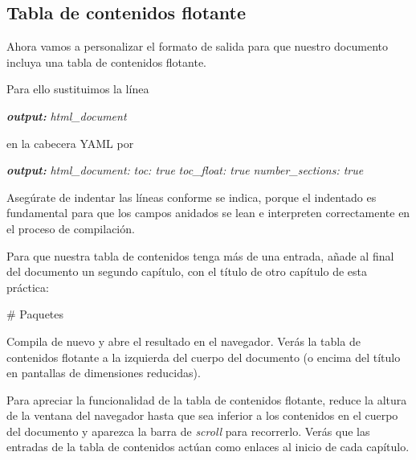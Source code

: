 \documentclass[
  degree=mecinf,
  title=normal,
  toc=normal,
  bib=normal]{mnye}
\newenvironment{Shaded}{\begin{snugshade}}{\end{snugshade}}
\newcommand{\AnnotationTok}[1]{\textcolor[rgb]{0.56,0.35,0.01}{\textbf{\textit{#1}}}}
\newcommand{\CommentTok}[1]{\textcolor[rgb]{0.56,0.35,0.01}{\textit{#1}}}
\newcommand{\FunctionTok}[1]{\textcolor[rgb]{0.00,0.00,0.00}{#1}}
\begin{document}
\hypertarget{tabla-de-contenidos-flotante}{%
\subsection{Tabla de contenidos flotante}\label{tabla-de-contenidos-flotante}}

Ahora vamos a personalizar el formato de salida para que nuestro documento incluya una tabla de contenidos flotante.

Para ello sustituimos la línea

\begin{Shaded}
\begin{Highlighting}[]
\AnnotationTok{output:}\CommentTok{ html\_document}
\end{Highlighting}
\end{Shaded}

en la cabecera YAML por

\begin{Shaded}
\begin{Highlighting}[]
\AnnotationTok{output:}\CommentTok{ }
\CommentTok{    html\_document:}
\CommentTok{        toc: true}
\CommentTok{        toc\_float: true}
\CommentTok{        number\_sections: true}
\end{Highlighting}
\end{Shaded}

Asegúrate de indentar las líneas conforme se indica, porque el indentado es fundamental para que los campos anidados se lean e interpreten correctamente en el proceso de compilación.

Para que nuestra tabla de contenidos tenga más de una entrada, añade al final del documento un segundo capítulo, con el título de otro capítulo de esta práctica:

\begin{Shaded}
\begin{Highlighting}[]
\FunctionTok{\# Paquetes}
\end{Highlighting}
\end{Shaded}

Compila de nuevo y abre el resultado en el navegador. Verás la tabla de contenidos flotante a la izquierda del cuerpo del documento (o encima del título en pantallas de dimensiones reducidas).

Para apreciar la funcionalidad de la tabla de contenidos flotante, reduce la altura de la ventana del navegador hasta que sea inferior a los contenidos en el cuerpo del documento y aparezca la barra de \emph{scroll} para recorrerlo. Verás que las entradas de la tabla de contenidos actúan como enlaces al inicio de cada capítulo.
\end{document}
